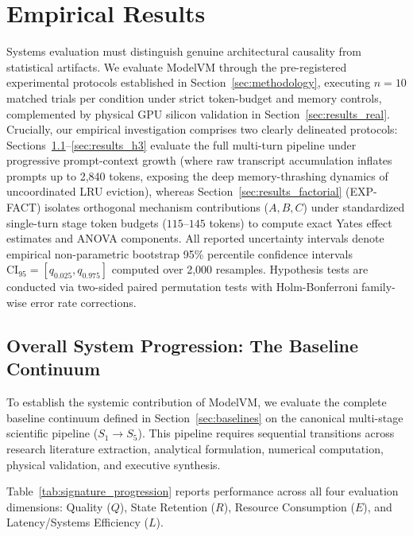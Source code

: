 \section{Empirical Results}
\label{sec:results}

Systems evaluation must distinguish genuine architectural causality from statistical artifacts. We evaluate ModelVM through the pre-registered experimental protocols established in Section~\ref{sec:methodology}, executing $n=10$ matched trials per condition under strict token-budget and memory controls, complemented by physical GPU silicon validation in Section~\ref{sec:results_real}. Crucially, our empirical investigation comprises two clearly delineated protocols: Sections~\ref{sec:results_signature}--\ref{sec:results_h3} evaluate the full multi-turn pipeline under progressive prompt-context growth (where raw transcript accumulation inflates prompts up to 2,840 tokens, exposing the deep memory-thrashing dynamics of uncoordinated LRU eviction), whereas Section~\ref{sec:results_factorial} (EXP-FACT) isolates orthogonal mechanism contributions ($A, B, C$) under standardized single-turn stage token budgets ($115\text{--}145$ tokens) to compute exact Yates effect estimates and ANOVA components. All reported uncertainty intervals denote empirical non-parametric bootstrap 95\% percentile confidence intervals $\text{CI}_{95} = [q_{0.025}, q_{0.975}]$ computed over 2,000 resamples. Hypothesis tests are conducted via two-sided paired permutation tests with Holm-Bonferroni family-wise error rate corrections.

\subsection{Overall System Progression: The Baseline Continuum}
\label{sec:results_signature}

To establish the systemic contribution of ModelVM, we evaluate the complete baseline continuum defined in Section~\ref{sec:baselines} on the canonical multi-stage scientific pipeline ($S_1 \to S_5$). This pipeline requires sequential transitions across research literature extraction, analytical formulation, numerical computation, physical validation, and executive synthesis.

Table~\ref{tab:signature_progression} reports performance across all four evaluation dimensions: Quality ($Q$), State Retention ($R$), Resource Consumption ($E$), and Latency/Systems Efficiency ($L$).

